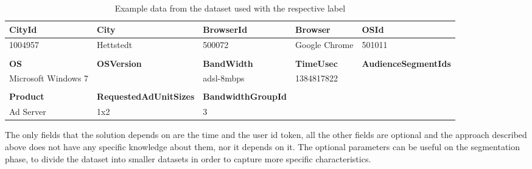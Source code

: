 \begin{table}[h]
\begin{tabular}{lllll}
\multicolumn{1}{l|}{\textbf{CityId}}                  & \multicolumn{1}{l|}{\textbf{City}}                        & \multicolumn{1}{l|}{\textbf{BrowserId}}        & \multicolumn{1}{l|}{\textbf{Browser}}  & \textbf{OSId}               \\ \hline
\multicolumn{1}{l|}{1004957}                          & \multicolumn{1}{l|}{Hettstedt}                            & \multicolumn{1}{l|}{500072}                    & \multicolumn{1}{l|}{Google Chrome}     & 501011                      \\
                                                      &                                                           &                                                &                                        &                             \\
\multicolumn{1}{l|}{\textbf{OS}}                      & \multicolumn{1}{l|}{\textbf{OSVersion}}                   & \multicolumn{1}{l|}{\textbf{BandWidth}}        & \multicolumn{1}{l|}{\textbf{TimeUsec}} & \textbf{AudienceSegmentIds} \\ \hline
\multicolumn{1}{l|}{Microsoft Windows 7}              & \multicolumn{1}{l|}{}                                     & \multicolumn{1}{l|}{adsl-8mbps}                & \multicolumn{1}{l|}{1384817822}        &                             \\
                                                      &                                                           &                                                &                                        &                             \\
\multicolumn{1}{l|}{\textbf{Product}}                 & \multicolumn{1}{l|}{\textbf{RequestedAdUnitSizes}}        & \multicolumn{1}{l|}{\textbf{BandwidthGroupId}} &                                        &                             \\ \cline{1-3}
\multicolumn{1}{l|}{Ad Server}                        & \multicolumn{1}{l|}{1x2}                                  & \multicolumn{1}{l|}{3}                         &                                        &                            
\end{tabular}
\caption{Example data from the dataset used with the respective label}\label{tab:dataset}
\end{table}

The only fields that the solution depends on are the time and the user id token,
all the other fields are optional and the approach described above does not have
any specific knowledge about them, nor it depends on it. The optional parameters
can be useful on the segmentation phase, to divide the dataset into smaller
datasets in order to capture more specific characteristics.

